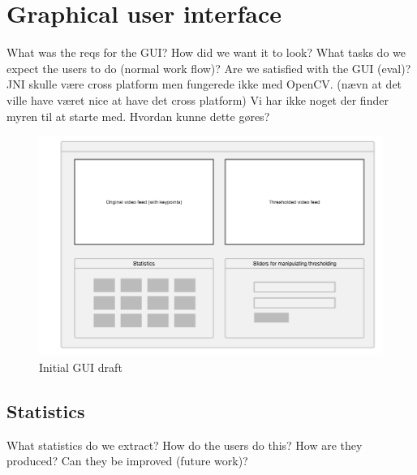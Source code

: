 
\section{Graphical user interface}

What was the reqs for the GUI?
How did we want it to look?
What tasks do we expect the users to do (normal work flow)?
Are we satisfied with the GUI (eval)?
JNI skulle være cross platform men fungerede ikke med OpenCV.
(nævn at det ville have været nice at have det cross platform)
Vi har ikke noget der finder myren til at starte med. Hvordan kunne dette gøres?

\begin{figure}[!ht]
    \centering
    \includegraphics[scale = 0.3]{img/termes_gui.png}
    \caption{Initial GUI draft}
\end{figure}

\subsection{Statistics}
What statistics do we extract?
How do the users do this?
How are they produced?
Can they be improved (future work)?
